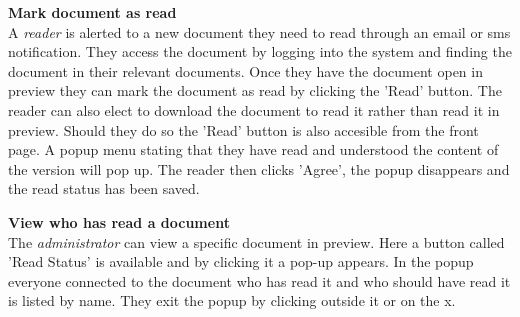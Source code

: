 \textbf{Mark document as read}
\\
A \textit{reader} is alerted to a new document they need to read through an email or sms notification.
They access the document by logging into the system and finding the document in their relevant documents.
Once they have the document open in preview they can mark the document as read by clicking the 'Read' button.
The reader can also elect to download the document to read it rather than read it in preview.
Should they do so the 'Read' button is also accesible from the front page.
A popup menu stating that they have read and understood the content of the version will pop up.
The reader then clicks 'Agree', the popup disappears and the read status has been saved.

\textbf{View who has read a document}
\\
The \textit{administrator} can view a specific document in preview.
Here a button called 'Read Status' is available and by clicking it a pop-up appears.
In the popup everyone connected to the document who has read it and who should have read it is listed by name.
They exit the popup by clicking outside it or on the x.

